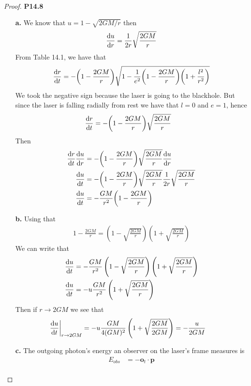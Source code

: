 \documentclass[11pt]{article}
\theoremstyle{definition}
\begin{document}
\cleardoublepage
\begin{proof}{\textbf{P14.8}}
\begin{itemize}
\item [\textbf{a.}]
We know that $u = 1 - \sqrt{2GM/r}$ then
\begin{align*}
    \dv{u}{r} = \frac{1}{2r}\sqrt{\frac{2GM}{r}}
\end{align*}
From Table 14.1, we have that
\begin{align*}
    \dv{r}{t}= -\bigg(1 - \frac{2GM}{r}\bigg)
    \sqrt{1 - \frac{1}{e^2}\bigg(1 - \frac{2GM}{r}\bigg)\bigg(1 + \frac{l^2}{r^2}\bigg)}
\end{align*}
We took the negative sign because the laser is going to the blackhole.
But since the laser is falling radially from rest we have that $l = 0$ and
$e = 1$, hence
\begin{align*}
    \dv{r}{t} &= -\bigg(1 - \frac{2GM}{r}\bigg)\sqrt{\frac{2GM}{r}}
\end{align*}
Then
\begin{align*}
    \dv{r}{t}\dv{u}{r}
    &= -\bigg(1 - \frac{2GM}{r}\bigg)\sqrt{\frac{2GM}{r}}\dv{u}{r}\\
    \dv{u}{t}
    &= -\bigg(1 - \frac{2GM}{r}\bigg)\sqrt{\frac{2GM}{r}}
    \frac{1}{2r}\sqrt{\frac{2GM}{r}}\\
    \dv{u}{t}
    &= -\frac{GM}{r^2}\bigg(1 - \frac{2GM}{r}\bigg)
\end{align*}
\item [\textbf{b.}]
Using that
\begin{align*}
    1 - \frac{2GM}{r}
    = \left(1 - \sqrt{\frac{2GM}{r}}\right)\left(1 + \sqrt{\frac{2GM}{r}}\right)
\end{align*}
We can write that
\begin{align*}
    \dv{u}{t}
    &= -\frac{GM}{r^2}\left(1 - \sqrt{\frac{2GM}{r}}\right)
    \left(1 + \sqrt{\frac{2GM}{r}}\right)\\
    \dv{u}{t} &= -u\frac{GM}{r^2}\left(1 + \sqrt{\frac{2GM}{r}}\right)
\end{align*}
Then if $r \to 2GM$ we see that
\begin{align*}
    \dv{u}{t}\bigg|_{r\to 2GM} &=
    -u\frac{GM}{4(GM)^2}\left(1 + \sqrt{\frac{2GM}{2GM}}\right)
    = -\frac{u}{2GM}
\end{align*}
\item [\textbf{c.}]
The outgoing photon's energy an observer on the laser's frame measures is
\begin{align*}
    E_{obs} &= - \bm{o}_t \cdot \bm{p}\\

\end{align*}
\end{itemize}
\end{proof}
\end{document}
